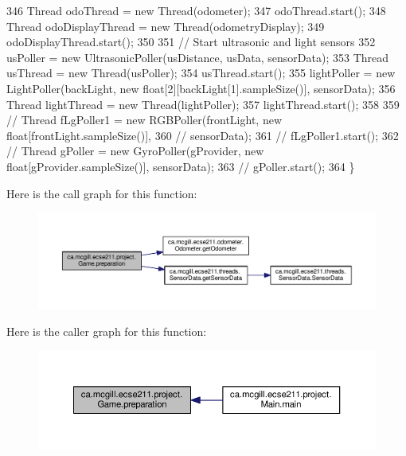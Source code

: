 \begin{DoxyCode}
346     Thread odoThread = new Thread(odometer);
347     odoThread.start();
348     Thread odoDisplayThread = new Thread(odometryDisplay);
349     odoDisplayThread.start();
350 
351     \textcolor{comment}{// Start ultrasonic and light sensors}
352     usPoller = new UltrasonicPoller(usDistance, usData, sensorData);
353     Thread usThread = new Thread(usPoller);
354     usThread.start();
355     lightPoller = new LightPoller(backLight, new \textcolor{keywordtype}{float}[2][backLight[1].sampleSize()], sensorData);
356     Thread lightThread = new Thread(lightPoller);
357     lightThread.start();
358 
359     \textcolor{comment}{// Thread fLgPoller1 = new RGBPoller(frontLight, new float[frontLight.sampleSize()],}
360     \textcolor{comment}{// sensorData);}
361     \textcolor{comment}{// fLgPoller1.start();}
362     \textcolor{comment}{// Thread gPoller = new GyroPoller(gProvider, new float[gProvider.sampleSize()], sensorData);}
363     \textcolor{comment}{// gPoller.start();}
364   \}
\end{DoxyCode}
Here is the call graph for this function\+:
\nopagebreak
\begin{figure}[H]
\begin{center}
\leavevmode
\includegraphics[width=350pt]{enumca_1_1mcgill_1_1ecse211_1_1project_1_1_game_a8f3c5b18f98ee56f5f03afd72fa40bcb_cgraph}
\end{center}
\end{figure}
Here is the caller graph for this function\+:
\nopagebreak
\begin{figure}[H]
\begin{center}
\leavevmode
\includegraphics[width=350pt]{enumca_1_1mcgill_1_1ecse211_1_1project_1_1_game_a8f3c5b18f98ee56f5f03afd72fa40bcb_icgraph}
\end{center}
\end{figure}
\mbox{\label{enumca_1_1mcgill_1_1ecse211_1_1project_1_1_game_ab28110fca0af679acdaea84025746f15}} 

